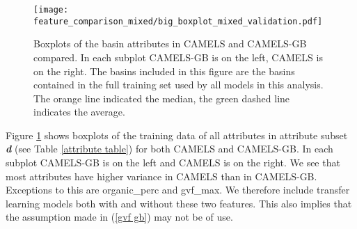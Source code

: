 \begin{figure}
    \centering
    \texttt{[image: feature\_comparison\_mixed/big\_boxplot\_mixed\_validation.pdf]}
    \caption[Attribute boxplots CAMELS and CAMELS-GB.]{Boxplots of the basin attributes in CAMELS and CAMELS-GB compared. 
    In each subplot CAMELS-GB is on the left, CAMELS is on the right. The basins included in this 
    figure are the basins contained in the full training set used by all models 
    in this analysis. The orange line indicated the median, the green dashed line indicates the average. }
    \label{attribute comparison}
\end{figure}
Figure \ref{attribute comparison} shows boxplots of the training data of all attributes 
in attribute subset \textbf{\textit{d}} (see Table 
\ref{attribute table}) for both CAMELS and CAMELS-GB. In each subplot CAMELS-GB is 
on the left and CAMELS is on the right. We see that most attributes have higher 
variance in CAMELS than in CAMELS-GB. Exceptions to this are organic\_perc and gvf\_max. 
We therefore include transfer learning models both with and without these two features. 
This also implies that the assumption made in (\ref{gvf gb}) may not be of use.
